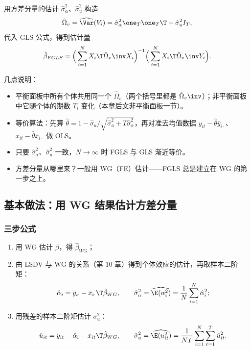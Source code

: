 \begin{defn}[可行 GLS]\label{def:U11a-fgls}
用方差分量的估计 $\hat\sigma_\alpha^2$、$\hat\sigma_u^2$ 构造
\[
\hat\Omega_v=\widehat{\Var}(V_i)=\hat\sigma_\alpha^2\one_T\one_T\T+\hat\sigma_u^2I_T ,
\]
代入 GLS 公式，得到估计量
\begin{equation}\label{eq:U11a-fgls}
\hat\beta_{FGLS}=\Big(\sum_{i=1}^NX_i\T\hat\Omega_v\inv X_i\Big)^{-1}\Big(\sum_{i=1}^NX_i\T\hat\Omega_v\inv Y_i\Big).
\end{equation}
\end{defn}

几点说明：
\begin{itemize}
  \item 平衡面板中所有个体共用同一个 $\hat\Omega_v$（两个括号里都是 $\hat\Omega_v\inv$）；非平衡面板中它随个体的期数 $T_i$ 变化（本章后文非平衡面板一节）。
  \item 等价算法：先算 $\hat\theta=1-\hat\sigma_u/\sqrt{\hat\sigma_u^2+T\hat\sigma_\alpha^2}$，再对准去均值数据 $y_{it}-\hat\theta\bar y_{i\cdot}$、$x_{it}-\hat\theta\bar x_{i\cdot}$ 做 OLS。
  \item 只要 $\hat\sigma_\alpha^2$、$\hat\sigma_u^2$ 一致，$N\to\infty$ 时 FGLS 与 GLS 渐近等价。
  \item 方差分量从哪里来？一般用 WG（FE）估计——FGLS 总是建立在 WG 的第一步之上。
\end{itemize}

\subsection{基本做法：用 WG 结果估计方差分量}

\subsubsection{三步公式}

\begin{enumerate}
  \item 用 WG 估计 $\beta$，得 $\hat\beta_{WG}$；
  \item 由 LSDV 与 WG 的关系（第 10 章）得到个体效应的估计，再取样本二阶矩：
  \[
  \hat\alpha_i=\bar y_{i\cdot}-\bar x_{i\cdot}\T\hat\beta_{WG},\qquad \hat\sigma_\alpha^2=\widehat{\E(\alpha_i^2)}=\frac1N\sum_{i=1}^N\hat\alpha_i^2 ;
  \]
  \item 用残差的样本二阶矩估计 $\sigma_u^2$：
  \[
  \hat u_{it}=y_{it}-\hat\alpha_i-x_{it}\T\hat\beta_{WG},\qquad \hat\sigma_u^2=\widehat{\E(u_{it}^2)}=\frac1{NT}\sum_{i=1}^N\sum_{t=1}^T\hat u_{it}^2 .
  \]
\end{enumerate}

